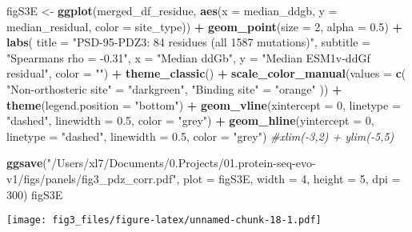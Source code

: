 \documentclass[
]{article}
\newenvironment{Shaded}{\begin{snugshade}}{\end{snugshade}}
\newcommand{\AttributeTok}[1]{\textcolor[rgb]{0.13,0.29,0.53}{#1}}
\newcommand{\CommentTok}[1]{\textcolor[rgb]{0.56,0.35,0.01}{\textit{#1}}}
\newcommand{\DecValTok}[1]{\textcolor[rgb]{0.00,0.00,0.81}{#1}}
\newcommand{\FloatTok}[1]{\textcolor[rgb]{0.00,0.00,0.81}{#1}}
\newcommand{\FunctionTok}[1]{\textcolor[rgb]{0.13,0.29,0.53}{\textbf{#1}}}
\newcommand{\NormalTok}[1]{#1}
\newcommand{\OtherTok}[1]{\textcolor[rgb]{0.56,0.35,0.01}{#1}}
\newcommand{\SpecialCharTok}[1]{\textcolor[rgb]{0.81,0.36,0.00}{\textbf{#1}}}
\newcommand{\StringTok}[1]{\textcolor[rgb]{0.31,0.60,0.02}{#1}}
\begin{document}
\begin{Shaded}
\begin{Highlighting}[]
\NormalTok{figS3E }\OtherTok{\textless{}{-}} \FunctionTok{ggplot}\NormalTok{(merged\_df\_residue, }\FunctionTok{aes}\NormalTok{(}\AttributeTok{x =}\NormalTok{ median\_ddgb, }\AttributeTok{y =}\NormalTok{  median\_residual, }\AttributeTok{color =}\NormalTok{ site\_type)) }\SpecialCharTok{+}
  \FunctionTok{geom\_point}\NormalTok{(}\AttributeTok{size =} \DecValTok{2}\NormalTok{, }\AttributeTok{alpha =} \FloatTok{0.5}\NormalTok{) }\SpecialCharTok{+}
  \FunctionTok{labs}\NormalTok{(}
    \AttributeTok{title =} \StringTok{"PSD{-}95{-}PDZ3: 84 residues (all 1587 mutations)"}\NormalTok{,}
    \AttributeTok{subtitle =} \StringTok{"Spearman\textquotesingle{}s rho = {-}0.31"}\NormalTok{,}
    \AttributeTok{x =} \StringTok{"Median ddGb"}\NormalTok{,}
    \AttributeTok{y =} \StringTok{"Median ESM1v{-}ddGf residual"}\NormalTok{,}
    \AttributeTok{color =} \StringTok{""}\NormalTok{) }\SpecialCharTok{+}
  \FunctionTok{theme\_classic}\NormalTok{() }\SpecialCharTok{+}
    \FunctionTok{scale\_color\_manual}\NormalTok{(}\AttributeTok{values =} \FunctionTok{c}\NormalTok{(}
    \StringTok{"Non{-}orthosteric site"} \OtherTok{=} \StringTok{"darkgreen"}\NormalTok{,}
    \StringTok{"Binding site"} \OtherTok{=} \StringTok{"orange"}
\NormalTok{  )) }\SpecialCharTok{+} \FunctionTok{theme}\NormalTok{(}\AttributeTok{legend.position =} \StringTok{"bottom"}\NormalTok{) }\SpecialCharTok{+}
  \FunctionTok{geom\_vline}\NormalTok{(}\AttributeTok{xintercept =} \DecValTok{0}\NormalTok{, }\AttributeTok{linetype =} \StringTok{"dashed"}\NormalTok{, }\AttributeTok{linewidth =} \FloatTok{0.5}\NormalTok{, }\AttributeTok{color =} \StringTok{"grey"}\NormalTok{) }\SpecialCharTok{+}
  \FunctionTok{geom\_hline}\NormalTok{(}\AttributeTok{yintercept =} \DecValTok{0}\NormalTok{, }\AttributeTok{linetype =} \StringTok{"dashed"}\NormalTok{, }\AttributeTok{linewidth =} \FloatTok{0.5}\NormalTok{, }\AttributeTok{color =} \StringTok{"grey"}\NormalTok{) }
  \CommentTok{\#xlim({-}3,2) + ylim({-}5,5)}

\FunctionTok{ggsave}\NormalTok{(}\StringTok{"/Users/xl7/Documents/0.Projects/01.protein{-}seq{-}evo{-}v1/figs/panels/fig3\_pdz\_corr.pdf"}\NormalTok{, }
       \AttributeTok{plot =}\NormalTok{ figS3E, }\AttributeTok{width =} \DecValTok{4}\NormalTok{, }\AttributeTok{height =} \DecValTok{5}\NormalTok{, }\AttributeTok{dpi =} \DecValTok{300}\NormalTok{)}
\NormalTok{figS3E}
\end{Highlighting}
\end{Shaded}

\texttt{[image: fig3\_files/figure-latex/unnamed-chunk-18-1.pdf]}
\end{document}
